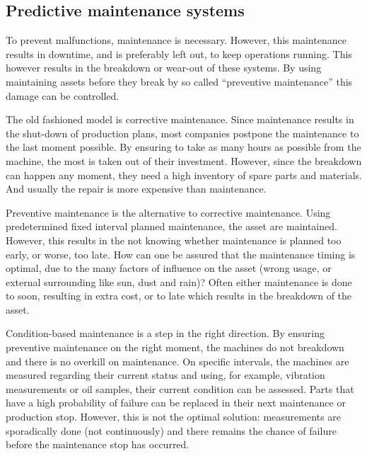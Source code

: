 
\subsection{Predictive maintenance systems}
To prevent malfunctions, maintenance is necessary. However, this maintenance results in downtime, and is preferably left out, to keep operations running. This however results in the breakdown or wear-out of these systems. By using maintaining assets before they break by so called ``preventive maintenance'' this damage can be controlled. %

The old fashioned model is corrective maintenance. Since maintenance results in the shut-down of production plans, most companies postpone the maintenance to the last moment possible. By ensuring to take as many hours as possible from the machine, the most is taken out of their investment. However, since the breakdown can happen any moment, they need a high inventory of spare parts and materials.  And usually the repair is more expensive than maintenance. %

Preventive maintenance is the alternative to corrective maintenance. Using predetermined fixed interval planned maintenance, the asset are maintained. However, this results in the not knowing whether maintenance is planned too early, or worse, too late. How can one be assured that the maintenance timing is optimal, due to the many factors of influence on the asset (wrong usage, or external surrounding like sun, dust and rain)? Often either maintenance is done to soon, resulting in extra cost, or to late which results in the breakdown of the asset.

Condition-based maintenance is a step in the right direction. By ensuring preventive maintenance on the right moment, the machines do not breakdown and there is no overkill on maintenance. On specific intervals, the machines are measured regarding their current status and using, for example, vibration measurements or oil samples, their current condition can be assessed. Parts that have a high probability of failure can be replaced in their next maintenance or production stop. However, this is not the optimal solution: measurements are sporadically done (not continuously) and there remains the chance of failure before the maintenance stop has occurred.

